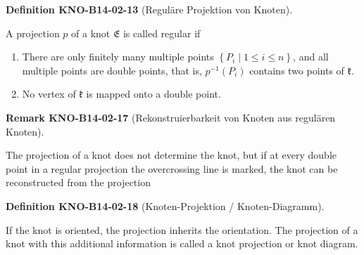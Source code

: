 \documentclass[10pt, letterpaper]{article}
\newcommand{\CustomHeading}[3]{%
  \par\medskip\noindent%
  \textbf{#1 #2} \textnormal{(#3)}.\enskip%
}
\newenvironment{DEF}[2]{\CustomHeading{Definition}{#1}{#2}}{}
\newenvironment{REM}[2]{\CustomHeading{Remark}{#1}{#2}}{}
\begin{document}
\begin{DEF}{KNO-B14-02-13}{Reguläre Projektion von Knoten}
A projection $p$ of a knot $\mathfrak{E}$ is called regular if\\
\begin{enumerate}
  \item There are only finitely many multiple points \( \left\{P_{i} \mid 1 \leq i \leq n\right\} \), and all multiple points are double points, that is, \( p^{-1}\left(P_{i}\right) \) contains two points of \( \mathfrak{k} \).
  \item No vertex of \( \mathfrak{k} \) is mapped onto a double point.
\end{enumerate}
\end{DEF}

\begin{REM}{KNO-B14-02-17}{Rekonstruierbarkeit von Knoten aus regulären Knoten}
The projection of a knot does not determine the knot, but if at every double point in a regular projection the overcrossing line is marked, the knot can be reconstructed from the projection
\end{REM}

\begin{DEF}{KNO-B14-02-18}{Knoten-Projektion / Knoten-Diagramm}
If the knot is oriented, the projection inherits the orientation. The projection of a knot with this additional information is called a knot projection or knot diagram.
\end{DEF}
\end{document}
